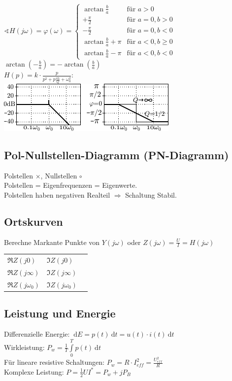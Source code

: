\documentclass[6pt,a4paper]{scrartcl}
\newcommand{\Ra}[0]{\ensuremath{\Rightarrow}}									%
\newcommand{\diff}{\ensuremath{\ \mathrm d}}									%
\begin{document}
\begin{multicols}{4}
$\sphericalangle H(j \omega) = \varphi(\omega) = \begin{cases}
\arctan \frac{b}{a} & \text{für } a > 0 \\
+ \frac{\pi}{2} & \text{für } a= 0, b > 0 \\
- \frac{\pi}{2} & \text{für } a = 0, b < 0 \\
\arctan \frac{b}{a} + \pi & \text{für } a < 0, b \ge 0 \\
\arctan \frac{b}{a} - \pi & \text{für } a < 0 , b < 0
\end{cases}$\\
$\arctan \left( - \frac{b}{a} \right) = - \arctan \left( \frac{b}{a} \right)$
\\[6em]
$H(p) = k \cdot \frac{p}{p^2 + p \frac{\omega_0}{Q} + \omega^2_0 }$:\\ \includegraphics{./img/bodesquare.pdf}




\subsection{Pol-Nullstellen-Diagramm (PN-Diagramm)}
Polstellen $\times$, Nullstellen $\circ$\\
Polstellen = Eigenfrequenzen = Eigenwerte.\\
Polstellen haben negativen Realteil $\Ra$ Schaltung Stabil.


\subsection{Ortskurven}
Berechne Markante Punkte von $Y(j\omega)$ oder $Z(j\omega)=\frac{U}{I}=H(j\omega)$\\
\begin{tabular}{lll}
$\Re Z(j0)$ & $\Im Z(j0)$\\
$\Re Z(j\infty)$ & $\Im Z(j\infty)$\\
$\Re Z(j\omega_0)$ & $\Im Z(j\omega_0)$\\
\end{tabular}


	\subsection{Leistung und Energie}
	Differenzielle Energie: $\diff E = p(t) \diff t = u(t) \cdot i(t) \diff t$\\
	Wirkleistung: $P_w = \frac{1}{T} \int\limits_0^T p(t) \diff t$\\
	Für lineare resistive Schaltungen: $P_w = R \cdot I^2_{eff} = \frac{U^2_{eff}}{R}$\\
	Komplexe Leistung: $P = \frac12 UI^* = P_w + j P_B$\\

\end{multicols}
\end{document}
